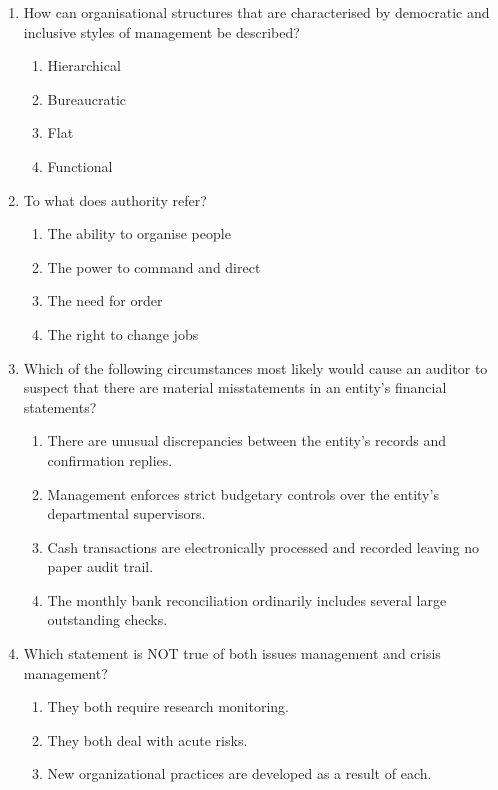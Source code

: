 \documentclass[12pt]{article}
\begin{document}
\begin{enumerate}[label=\arabic*.]
\begin{enumerate}[label=(\alph*)]
    \item Economic, Legal, Cultural and Philanthropic
    \item Economic, Legal, Ethical and Environmental
\end{enumerate}
\item How can organisational structures that are characterised by democratic and inclusive styles of management be described?
\begin{enumerate}[label=(\alph*)]
    \item Hierarchical
    \item Bureaucratic
    \item Flat
    \item Functional
\end{enumerate}
\item To what does authority refer?
\begin{enumerate}[label=(\alph*)]
    \item The ability to organise people
    \item The power to command and direct
    \item The need for order
    \item The right to change jobs
\end{enumerate}
\item Which of the following circumstances most likely would cause an auditor to suspect that there are material misstatements in an entity's financial statements?
\begin{enumerate}[label=(\alph*)]
    \item There are unusual discrepancies between the entity's records and confirmation replies.
    \item Management enforces strict budgetary controls over the entity's departmental supervisors.
    \item Cash transactions are electronically processed and recorded leaving no paper audit trail.
    \item The monthly bank reconciliation ordinarily includes several large outstanding checks.
\end{enumerate}
\item Which statement is NOT true of both issues management and crisis management?
\begin{enumerate}[label=(\alph*)]
    \item They both require research monitoring.
    \item They both deal with acute risks.
    \item New organizational practices are developed as a result of each.

\end{enumerate}
\end{enumerate}
\end{document}
